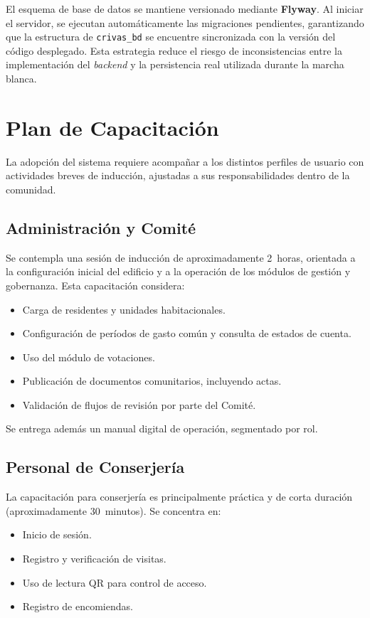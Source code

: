 El esquema de base de datos se mantiene versionado mediante \textbf{Flyway}. Al iniciar el servidor, se ejecutan automáticamente las migraciones pendientes, garantizando que la estructura de \texttt{crivas\_bd} se encuentre sincronizada con la versión del código desplegado. Esta estrategia reduce el riesgo de inconsistencias entre la implementación del \textit{backend} y la persistencia real utilizada durante la marcha blanca.

\section{Plan de Capacitación}

La adopción del sistema requiere acompañar a los distintos perfiles de usuario con actividades breves de inducción, ajustadas a sus responsabilidades dentro de la comunidad.

\subsection{Administración y Comité}

Se contempla una sesión de inducción de aproximadamente 2~horas, orientada a la configuración inicial del edificio y a la operación de los módulos de gestión y gobernanza. Esta capacitación considera:

\begin{itemize}
    \item Carga de residentes y unidades habitacionales.
    \item Configuración de períodos de gasto común y consulta de estados de cuenta.
    \item Uso del módulo de votaciones.
    \item Publicación de documentos comunitarios, incluyendo actas.
    \item Validación de flujos de revisión por parte del Comité.
\end{itemize}

Se entrega además un manual digital de operación, segmentado por rol.

\subsection{Personal de Conserjería}

La capacitación para conserjería es principalmente práctica y de corta duración (aproximadamente 30~minutos). Se concentra en:

\begin{itemize}
    \item Inicio de sesión.
    \item Registro y verificación de visitas.
    \item Uso de lectura QR para control de acceso.
    \item Registro de encomiendas.
\end{itemize}

